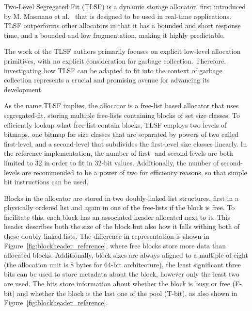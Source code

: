 
Two-Level Segregated Fit (TLSF) is a dynamic storage allocator, first introduced by M. Masmano et al.~\cite{TLSF} that is designed to be used in real-time applications. TLSF outperforms other allocators in that it has a bounded and short response time, and a bounded and low fragmentation, making it highly predictable.

The work of the TLSF authors primarily focuses on explicit low-level allocation primitives, with no explicit consideration for garbage collection. Therefore, investigating how TLSF can be adapted to fit into the context of garbage collection represents a crucial and promising avenue for advancing its development.

As the name TLSF implies, the allocator is a free-list based allocator that uses segregated-fit, storing multiple free-lists containing blocks of set size classes. To efficiently lookup what free-list contain blocks, TLSF employs two levels of bitmaps, one bitmap for size classes that are separated by powers of two called first-level, and a second-level that subdivides the first-level size classes linearly. In the reference implementation, the number of first- and second-levels are both limited to 32 in order to fit in 32-bit values. Additionally, the number of second-levels are recommended to be a power of two for efficiency reasons, so that simple bit instructions can be used.

Blocks in the allocator are stored in two doubly-linked list structures, first in a physically ordered list and again in one of the free-lists if the block is free. To facilitate this, each block has an associated header allocated next to it. This header describes both the size of the block but also how it falls withing both of these doubly-linked lists. The difference in representation is shown in Figure~\ref{fig:blockheader_reference}, where free blocks store more data than allocated blocks. Additionally, block sizes are always aligned to a multiple of eight (the allocation unit is 8 bytes for 64-bit architecture), the least significant three bits can be used to store metadata about the block, however only the least two are used. The bits store information about whether the block is busy or free (F-bit) and whether the block is the last one of the pool (T-bit), as also shown in Figure~\ref{fig:blockheader_reference}.

